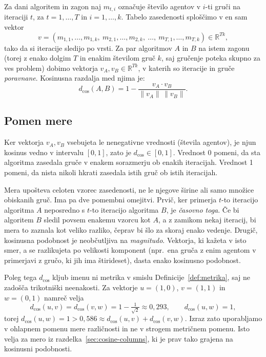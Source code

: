 \documentclass[a4paper, 12pt]{book}
\begin{document}
Za dani algoritem in zagon naj $m_{t,i}$ označuje število agentov v $i$-ti
gruči na iteraciji $t$, za $t = 1, \dots, T$ in $i = 1, \dots, k$. Tabelo
zasedenosti sploščimo v en sam vektor
\[
    v = (m_{1,1}, \dots, m_{1,k},\ m_{2,1}, \dots, m_{2,k},\ \dots,\
         m_{T,1}, \dots, m_{T,k}) \in \mathbb{R}^{Tk},
\]
tako da si iteracije sledijo po vrsti. Za par
algoritmov $A$ in $B$ na istem zagonu (torej z enako dolgim $T$ in enakim
številom gruč $k$, saj gručenje poteka skupno za ves problem) dobimo vektorja
$v_A, v_B \in \mathbb{R}^{Tk}$, v katerih so iteracije in gruče \emph{poravnane}. 
Kosinusna razdalja med njima je:
\[
    d_{\cos}(A, B) = 1 - \frac{v_A \cdot v_B}{\lVert v_A \rVert \, \lVert v_B \rVert}.
\]

\subsection{Pomen mere}

Ker vektorja $v_A, v_B$ vsebujeta le nenegativne vrednosti (števila
agentov), je njun kosinus vedno v intervalu $[0,1]$, zato je $d_{\cos} \in [0,1]$.
Vrednost 0 pomeni, da sta algoritma zasedala gruče v enakem sorazmerju ob
enakih iteracijah. Vrednost 1 pomeni, da nista nikoli hkrati
zasedala istih gruč ob istih iteracijah.

Mera upošteva celoten vzorec zasedenosti, ne le njegove širine ali samo množice obiskanih gruč.
Ima pa dve pomembni omejitvi. Prvič, ker primerja $t$-to iteracijo
algoritma $A$ neposredno s $t$-to iteracijo algoritma $B$, je \emph{časovno
toga}. Če bi algoritem $B$ sledil povsem enakemu vzorcu kot $A$, a z
zamikom nekaj iteracij, bi mera to zaznala kot veliko razliko, čeprav bi
šlo za skoraj enako vedenje. Drugič, kosinusna podobnost je
neobčutljiva na \emph{magnitudo}. Vektorja, ki kažeta v isto smer, a se
razlikujeta po velikosti komponent (npr.~ena gruča z enim agentom v
primerjavi z gručo, ki jih ima štirideset), dasta enako kosinusno
podobnost.

Poleg tega $d_{\cos}$ kljub imenu  ni metrika v smislu
Definicije~\ref{def:metrika}, saj ne zadošča trikotniški neenakosti. Za
vektorje $u = (1,0)$, $v = (1,1)$ in $w = (0,1)$ namreč velja
\[
    d_{\cos}(u,v) = d_{\cos}(v,w) = 1 - \tfrac{1}{\sqrt{2}} \approx 0{,}293,
    \qquad
    d_{\cos}(u,w) = 1,
\]
torej $d_{\cos}(u,w) = 1 > 0{,}586 \approx d_{\cos}(u,v) + d_{\cos}(v,w)$.
Izraz \sn{razdalja} zato uporabljamo v ohlapnem pomenu mere različnosti in ne
v strogem metričnem pomenu. Isto velja za mero iz
razdelka~\ref{sec:cosine-columns}, ki je prav tako grajena na kosinusni
podobnosti.
\end{document}
